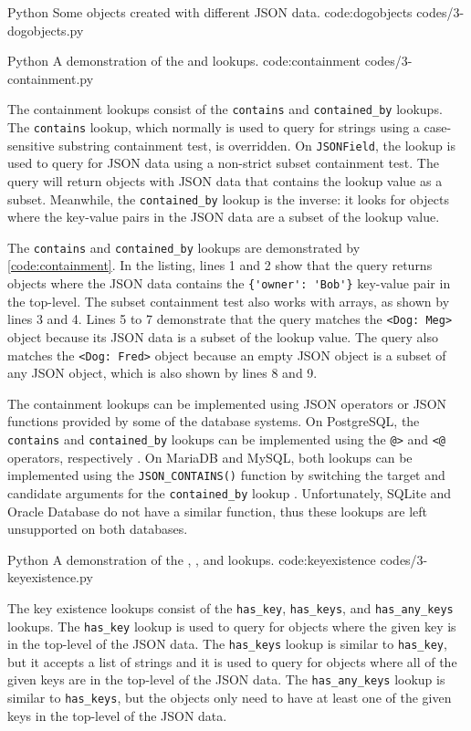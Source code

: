 \listing
{Python}
{Some  objects created with different JSON data.}
{code:dogobjects}
{codes/3-dogobjects.py}

\listing
{Python}
{A demonstration of the  and  lookups.}
{code:containment}
{codes/3-containment.py}

The containment lookups consist of the \verb|contains| and \verb|contained_by|
lookups. The \verb|contains| lookup, which normally is used to query for
strings using a case-sensitive substring containment test, is overridden. On
\verb|JSONField|, the lookup is used to query for JSON data using a non-strict
subset containment test. The query will return objects with JSON data that
contains the lookup value as a subset. Meanwhile, the \verb|contained_by|
lookup is the inverse: it looks for objects where the key-value pairs in the
JSON data are a subset of the lookup value.

The \verb|contains| and \verb|contained_by| lookups are demonstrated by
\autoref{code:containment}. In the listing, lines 1 and 2 show that the query
returns objects where the JSON data contains the \verb|{'owner': 'Bob'}|
key-value pair in the top-level. The subset containment test also works with
arrays, as shown by lines 3 and 4. Lines 5 to 7 demonstrate that the query
matches the \verb|<Dog: Meg>| object because its JSON data is a subset of the
lookup value. The query also matches the \verb|<Dog: Fred>| object because an
empty JSON object is a subset of any JSON object, which is also shown by lines
8 and 9.

The containment lookups can be implemented using JSON operators or JSON
functions provided by some of the database systems. On PostgreSQL, the
\verb|contains| and \verb|contained_by| lookups can be implemented using the
\verb|@>| and \verb|<@| operators, respectively \cite{postgres:json_operators}.
On MariaDB and MySQL, both lookups can be implemented using the
\verb|JSON_CONTAINS()| function by switching the target and candidate arguments
for the \verb|contained_by| lookup \cite{mariadb:json_contains,
mysql:json_search}. Unfortunately, SQLite and Oracle Database do not have a
similar function, thus these lookups are left unsupported on both databases.

\listing
{Python}
{A demonstration of the
, , and  lookups.}
{code:keyexistence}
{codes/3-keyexistence.py}

The key existence lookups consist of the \verb|has_key|, \verb|has_keys|, and
\verb|has_any_keys| lookups. The \verb|has_key| lookup is used to query for
objects where the given key is in the top-level of the JSON data. The
\verb|has_keys| lookup is similar to \verb|has_key|, but it accepts a list of
strings and it is used to query for objects where all of the given keys are
in the top-level of the JSON data. The \verb|has_any_keys| lookup is similar
to \verb|has_keys|, but the objects only need to have at least one of the
given keys in the top-level of the JSON data.

